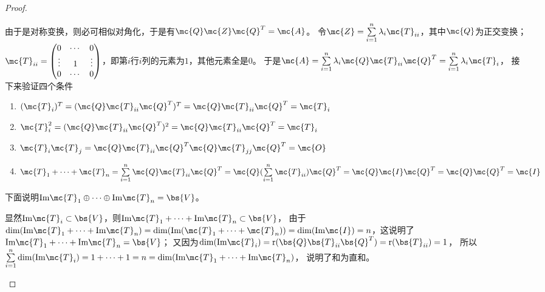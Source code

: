 \documentclass[12pt, a4paper, oneside, UTF8]{ctexbook}
\begin{document}
\begin{proof}
\begin{enumerate}[label=(\arabic*)]
    由于是对称变换，则必可相似对角化，于是有$\mc{Q}\mc{Z}\mc{Q}^{T}=\mc{A}$。
    令$\mc{Z}=\sum\limits_{i=1}^n \lambda_i \mc{T}_{ii}$，其中$\mc{Q}$为正交变换；$\mc{T}_{ii}=\begin{pmatrix}
        0& \cdots &0 \\
        \vdots & 1 & \vdots \\
        0 & \cdots & 0
    \end{pmatrix}$，即第$i$行$i$列的元素为$1$，其他元素全是0。
    于是$\mc{A}=\sum\limits_{i=1}^n\lambda_i \mc{Q}\mc{T}_{ii}\mc{Q}^T=\sum\limits_{i=1}^n\lambda_i \mc{T}_i$，
    接下来验证四个条件
    \begin{enumerate}
        \item $(\mc{T}_i)^T=(\mc{Q}\mc{T}_{ii}\mc{Q}^T)^T=\mc{Q}\mc{T}_{ii}\mc{Q}^T=\mc{T}_i$
        \item $\mc{T}_i^2=(\mc{Q}\mc{T}_{ii}\mc{Q}^T)^2=\mc{Q}\mc{T}_{ii}\mc{Q}^T=\mc{T}_i$
        \item $\mc{T}_i\mc{T}_j=\mc{Q}\mc{T}_{ii}\mc{Q}^T\mc{Q}\mc{T}_{jj}\mc{Q}^T=\mc{O}$
        \item $\mc{T}_1+\cdots+\mc{T}_n=\sum\limits_{i=1}^n \mc{Q}\mc{T}_{ii}\mc{Q}^T=
        \mc{Q} (\sum\limits_{i=1}^n \mc{T}_{ii} )\mc{Q}^T
        =\mc{Q}\mc{I}\mc{Q}^T=\mc{Q}\mc{Q}^T=\mc{I}$
    \end{enumerate}
    
    下面说明$\mathrm{Im}\mc{T}_1 \oplus \cdots \oplus \mathrm{Im}\mc{T}_n=\bs{V}$。
    
    显然$\mathrm{Im}\mc{T}_i \subset \bs{V}$，则$\mathrm{Im}\mc{T}_1 +\cdots +\mathrm{Im}\mc{T}_n \subset \bs{V}$，
    由于$\mathrm{dim}(\mathrm{Im}\mc{T}_1 +\cdots +\mathrm{Im}\mc{T}_n)
    =\mathrm{dim}(\mathrm{Im}(\mc{T}_1 +\cdots+\mc{T}_n))
    =\mathrm{dim}(\mathrm{Im}\mc{I})=n$，这说明了$\mathrm{Im}\mc{T}_1 +\cdots +\mathrm{Im}\mc{T}_n = \bs{V}$；
    又因为$\mathrm{dim}(\mathrm{Im}\mc{T}_i)=\mathrm{r}(\bs{Q}\bs{T}_{ii}\bs{Q}^T)=\mathrm{r}(\bs{T}_{ii})=1$，
    所以$\sum\limits_{i=1}^n \mathrm{dim}(\mathrm{Im}\mc{T}_i)=1+\cdots+1=n=\mathrm{dim}(\mathrm{Im}\mc{T}_1 +\cdots +\mathrm{Im}\mc{T}_n)$，
    说明了和为直和。
    \end{enumerate}
\end{proof}
\ifx\allfiles\undefined
\end{document}
